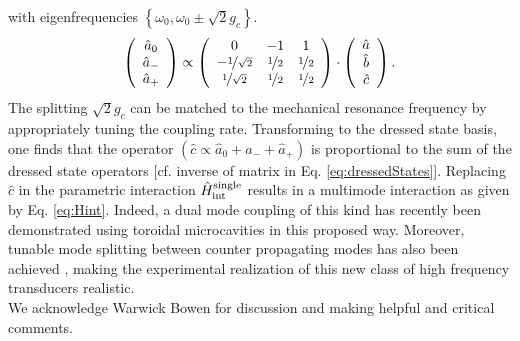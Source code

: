 \documentclass[twocolumn,english,aps,prl,superscriptaddress,showpacs,preprintnumbers]{revtex4}
\begin{document}
with eigenfrequencies $\left\{ \omega_{0},\omega_{0}\pm\sqrt{2}g_{c}\right\} $.\begin{equation}
\left(\begin{array}{c}
\hat{a}_{0}\\
\hat{a}_{-}\\
\hat{a}_{+}\end{array}\right)\propto\left(\begin{array}{ccc}
0 & -1 & 1\\
-\nicefrac{1}{\sqrt{2}} & \nicefrac{1}{2} & \nicefrac{1}{2}\\
\nicefrac{1}{\sqrt{2}} & \nicefrac{1}{2} & \nicefrac{1}{2}\end{array}\right)\cdot\left(\begin{array}{c}
\hat{a}\\
\hat{b}\\
\hat{c}\end{array}\right).\label{eq:dressedStates}\end{equation}
The splitting $\sqrt{2}g_{c}$ can be matched to the mechanical resonance
frequency by appropriately tuning the coupling rate. Transforming to the
dressed state basis, one finds that the operator $(\hat{c}\propto\hat{a}_{0}+\hat{a}_{-}+\hat{a}_{+})$
is proportional to the sum of the dressed state operators {[}cf. inverse
of matrix in Eq. \ref{eq:dressedStates}{]}. Replacing $\hat{c}$ in
the parametric interaction $\hat{H}_{{\rm int}}^{{\rm single}}$ results
in a multimode interaction as given by Eq. \ref{eq:Hint}.
Indeed, a dual mode coupling of this kind has recently been demonstrated
using toroidal microcavities \cite{grudinin_phonon_2009} in this proposed way. Moreover,
tunable mode splitting between counter propagating modes has also
been achieved \cite{anetsberger_near-field_2009}, making the experimental realization of this new class of high frequency transducers realistic.\\
We acknowledge Warwick Bowen for discussion and making helpful and critical comments.


\end{document}
